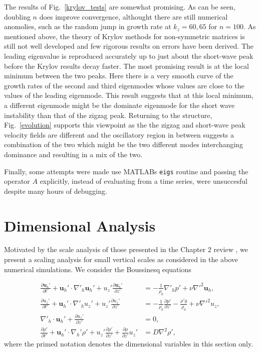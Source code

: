 The results of Fig.~\ref{krylov_tests} are somewhat promising. As can be seen, doubling $n$ does improve convergence, althought there are still numerical anomolies, such as the random jump in growth rate at $k_{z}=60,65$ for $n=100$. As mentioned above, the theory of Krylov methods for non-symmetric matrices is still not well developed and few rigorous results on errors have been derived. The leading eigenvalue is reproduced accurately up to just about the short-wave peak before the Krylov results decay faster. The most promising result is at the local minimum between the two peaks. Here there is a very smooth curve of the growth rates of the second and third eigenmodes whose values are close to the values of the leading eigenmode. This result suggests that at this local minimum, a different eigenmode might be the dominate eigenmode for the short wave instability than that of the zigzag peak. Returning to the structure, Fig.~\ref{evolution} supports this viewpoint as the the zigzag and short-wave peak velocity fields are different and the oscillatory region in between suggests a combination of the two which might be the two different modes interchanging dominance and resulting in a mix of the two. 

Finally, some attempts were made use MATLABs \texttt{eigs} routine and passing the operator $A$ explicitly, instead of evaluating from a time series, were unsuccesful despite many hours of debugging. 

\section{Dimensional Analysis}
Motivated by the scale analysis of those presented in the Chapter 2 review \cite{lilly1983,rileylelong2000,bc2001,brethouwer2007}, we present a scaling analysis for small vertical scales as considered in the above numerical simulations. We consider the Boussinesq equations

\begin{align}
\frac{\partial \textbf{u}_{h}'}{\partial t'} + \textbf{u}_{h}'\cdot\nabla'_{h}\textbf{u}_{h}'+u_{z}'\frac{\partial \textbf{u}_{h}'}{\partial z'} &= -\frac{1}{\rho_{0}}\nabla'_{h}p' + \nu \nabla'^{2}\textbf{u}_{h}\label{scaling_horz},\\
\frac{\partial u_{z}'}{\partial t'} + \textbf{u}_{h}'\cdot\nabla'_{h}u_{z}'+u_{z}'\frac{\partial u_{z}'}{\partial z'} &= -\frac{1}{\rho_{0}}\frac{\partial p'}{\partial z'} - \frac{\rho' g}{\rho_{0}} + \nu \nabla'^{2}u_{z},\label{scaling_vert}\\
\nabla'_{h}\cdot\textbf{u}_{h}' + \frac{\partial u_{z}'}{\partial z'} &=0,\label{scaling_cont}\\
\frac{\partial \rho'}{\partial t'} + \textbf{u}_{h}'\cdot\nabla_{h}'\rho' + u_{z}'\frac{\partial \rho'}{\partial z'} + \frac{\partial \rho}{\partial z'}u_{z}'&=D\nabla^{2}\rho ',\label{scaling_moment}
\end{align}
where the primed notation denotes the dimensional variables in this section only. 

